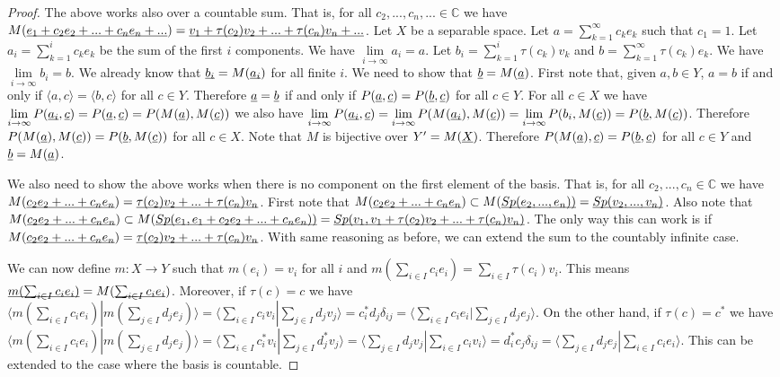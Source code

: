 \documentclass[aps,prl,amsmath,amssymb,twocolumn,nofootinbib]{revtex4}
\theoremstyle{plain}
\theoremstyle{definition}
\theoremstyle{remark}
\newcommand{\pj}[1] {\underbar{$#1$}}
\def\>{\rangle}
\def\<{\langle}
\begin{document}
\begin{proof}
		The above works also over a countable sum. That is, for all $c_2, ..., c_n, ... \in \mathbb{C}$ we have $M(\pj{e_1 + c_2 e_2 + ... + c_n e_n + ...}) = \pj{v_1 + \tau(c_2) v_2 + ... + \tau(c_n) v_n + ...}$. Let $X$ be a separable space. Let $a = \sum_{k=1}^\infty c_k e_k$ such that $c_1 = 1$. Let $a_i = \sum_{k=1}^i c_k e_k$ be the sum of the first $i$ components. We have $\lim\limits_{i \to \infty} a_i = a$. Let $b_i = \sum_{k=1}^i \tau(c_k) v_k$ and $b = \sum_{k=1}^\infty \tau(c_k) e_k$. We have $\lim\limits_{i \to \infty} b_i = b$. We already know that $\pj{b_i} = M(\pj{a_i})$ for all finite $i$. We need to show that $\pj{b} = M(\pj{a})$. First note that, given $a,b \in Y$, $a=b$ if and only if $\<a,c\> = \<b,c\>$ for all $c \in Y$. Therefore $\pj{a}=\pj{b}$ if and only if $P(\pj{a}, \pj{c}) = P(\pj{b}, \pj{c})$ for all $c \in Y$. For all $c \in X$ we have $\lim\limits_{i \to \infty} P(\pj{a_i}, \pj{c}) = P(\pj{a}, \pj{c}) = P(M(\pj{a}), M(\pj{c}))$ we also have  $\lim\limits_{i \to \infty} P(\pj{a_i}, \pj{c}) = \lim\limits_{i \to \infty} P(M(\pj{a_i}), M(\pj{c})) = \lim\limits_{i \to \infty} P(b_i, M(\pj{c})) = P(\pj{b}, M(\pj{c}))$. Therefore $P(M(\pj{a}), M(\pj{c})) = P(\pj{b}, M(\pj{c}))$ for all $c \in X$. Note that $M$ is bijective over $Y'=M(\pj{X})$. Therefore $P(M(\pj{a}), \pj{c}) = P(\pj{b}, \pj{c})$ for all $c \in Y$ and $\pj{b} = M(\pj{a})$.
		
		We also need to show the above works when there is no component on the first element of the basis. That is, for all $c_2, ..., c_n \in \mathbb{C}$ we have $M(\underbar{$c_2 e_2 + ... + c_n e_n$}) = \underbar{$\tau(c_2) v_2 + ... + \tau(c_n) v_n$}$. First note that $M(\underbar{$c_2 e_2 + ... + c_n e_n$}) \subset M(\underbar{$Sp(e_2, ..., e_n)$)} = \underbar{$Sp(v_2, ..., v_n)$}$. Also note that $M(\underbar{$c_2 e_2 + ... + c_n e_n$}) \subset M(\underbar{$Sp(e_1, e_1 + c_2 e_2 + ... + c_n e_n)$)} = \underbar{$Sp(v_1, v_1 + \tau(c_2) v_2 + ... + \tau(c_n) v_n)$}$. The only way this can work is if $M(\underbar{$c_2 e_2 + ... + c_n e_n$}) = \underbar{$\tau(c_2) v_2 + ... + \tau(c_n) v_n$}$. With same reasoning as before, we can extend the sum to the countably infinite case.
		
		We can now define $m : X \to Y$ such that $m(e_i) = v_i$ for all $i$ and $m(\sum_{i \in I} c_i e_i) = \sum_{i \in I} \tau(c_i) v_i$. This means $\underbar{$m(\sum_{i \in I} c_i e_i)$} = M(\underbar{$\sum_{i \in I} c_i e_i$})$. Moreover, if $\tau(c) = c$ we have $\<m(\sum_{i \in I} c_i e_i)|m(\sum_{j \in I} d_j e_j)\> = \<\sum_{i \in I} c_i v_i|\sum_{j \in I} d_j v_j\> = c_i^* d_j \delta_{ij} = \<\sum_{i \in I} c_i e_i|\sum_{j \in I} d_j e_j\>$. On the other hand, if $\tau(c) = c^*$ we have $\<m(\sum_{i \in I} c_i e_i)|m(\sum_{j \in I} d_j e_j)\> = \<\sum_{i \in I} c_i^* v_i|\sum_{j \in I} d_j^* v_j\> = \<\sum_{j \in I} d_j v_j|\sum_{i \in I} c_i v_i\> = d_i^* c_j \delta_{ij} = \<\sum_{j \in I} d_j e_j|\sum_{i \in I} c_i e_i\>$. This can be extended to the case where the basis is countable.
	\end{proof}
	
\end{document}

